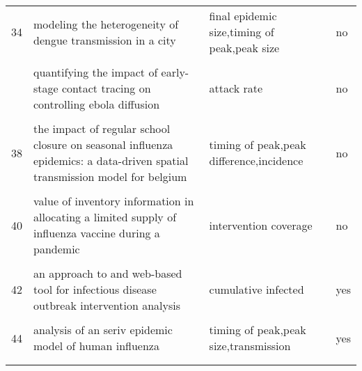 \documentclass[
]{article}
\begin{document}
\begin{landscape}
\begin{longtable}{l>{\raggedright\arraybackslash}p{4cm}>{\raggedright\arraybackslash}p{6cm}l}
34 & modeling the heterogeneity of dengue transmission in a city & final epidemic size,timing of peak,peak size & no\\
\cellcolor{gray!6}{35} & \cellcolor{gray!6}{modelling the large-scale yellow fever outbreak in luanda, angola, and the impact of vaccination} & \cellcolor{gray!6}{deaths averted,final epidemic size,attack rate,case fatality} & \cellcolor{gray!6}{yes}\\
\addlinespace
36 & quantifying the impact of early-stage contact tracing on controlling ebola diffusion & attack rate & no\\
\cellcolor{gray!6}{37} & \cellcolor{gray!6}{simulation of key interventions for seasonal influenza outbreak control at school in changsha, china} & \cellcolor{gray!6}{outbreak duration and timing,attack rate} & \cellcolor{gray!6}{no}\\
38 & the impact of regular school closure on seasonal influenza epidemics: a data-driven spatial transmission model for belgium & timing of peak,peak difference,incidence & no\\
\cellcolor{gray!6}{39} & \cellcolor{gray!6}{the potential impact of case-area targeted interventions in response to cholera outbreaks: a modeling study} & \cellcolor{gray!6}{cases averted,outbreak duration and timing,incidence} & \cellcolor{gray!6}{yes}\\
40 & value of inventory information in allocating a limited supply of influenza vaccine during a pandemic & intervention coverage & no\\
\addlinespace
\cellcolor{gray!6}{41} & \cellcolor{gray!6}{an age-structured model for cholera control with vaccination} & \cellcolor{gray!6}{final epidemic size} & \cellcolor{gray!6}{no}\\
42 & an approach to and web-based tool for infectious disease outbreak intervention analysis & cumulative infected & yes\\
\cellcolor{gray!6}{43} & \cellcolor{gray!6}{an economic assessment of foot and mouth disease in japan} & \cellcolor{gray!6}{outbreak duration and timing,final epidemic size,cost} & \cellcolor{gray!6}{no}\\
44 & analysis of an seriv epidemic model of human influenza & timing of peak,peak size,transmission & yes\\
\cellcolor{gray!6}{45} & \cellcolor{gray!6}{control strategies of avian influenza pandemic model with time delay} & \cellcolor{gray!6}{cases averted} & \cellcolor{gray!6}{no}\\
\addlinespace

\end{longtable}
\end{landscape}
\end{document}

